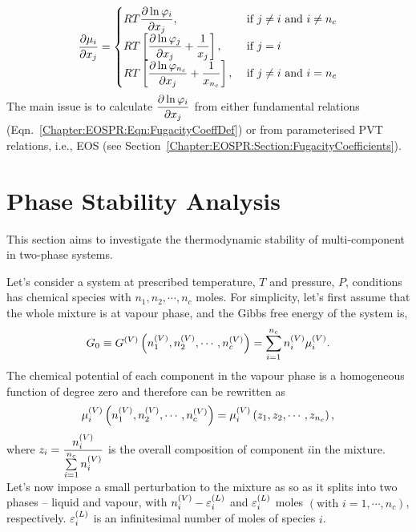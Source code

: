 \begin{equation}
  \frc{\partial\mu_{i}}{\partial x_{j}} = 
      \begin{cases}
          RT\frc{\partial\ln\varphi_{i}}{\partial x_{j}}, & \text{ if } j\ne i \text{ and } i\ne n_{c} \\
          RT\left[\frc{\partial\ln\varphi_{j}}{\partial x_{j}} + \frc{1}{x_{j}}\right], & \text{ if } j=i \\
          RT\left[\frc{\partial\ln\varphi_{n_{c}}}{\partial x_{j}} + \frc{1}{x_{n_{c}}}\right], & \text{ if } j\ne i \text{ and } i= n_{c}
      \end{cases}
\end{equation}
The main issue is to calculate $\frc{\partial\ln\varphi_{i}}{\partial x_{j}}$ from either fundamental relations (Eqn.~\ref{Chapter:EOSPR:Eqn:FugacityCoeffDef}) or from parameterised PVT relations, i.e., EOS (see Section~\ref{Chapter:EOSPR:Section:FugacityCoefficients}).

\section{Phase Stability Analysis}\label{Chapter:ThermodynamicFormulation:Section:PhaseStabilityAnalysis}
This section aims to investigate the thermodynamic stability of multi-component in two-phase systems. 

Let's consider a system at prescribed temperature, $T$ and pressure, $P$, conditions has chemical species with $n_{1}, n_{2}, \cdots, n_{c}$ moles. For simplicity, let's first assume that the whole mixture is at vapour phase, and the Gibbs free energy of the system is,
\begin{equation}
   G_{0} \equiv \mfr[G]{}{V}\left(\mfr[n]{1}{V}, \mfr[n]{2}{V}, \cdots, \mfr[n]{c}{V}\right) = \summation_{i=1}^{n_{c}}\mfr[n]{i}{V}\mfr[\mu]{i}{V}.
\end{equation}   
The chemical potential of each component in the vapour phase is a homogeneous function of degree zero and therefore can be rewritten as
\begin{displaymath}
   \mfr[\mu]{i}{V}\left(\mfr[n]{1}{V}, \mfr[n]{2}{V}, \cdots, \mfr[n]{c}{V}\right) = \mfr[\mu]{i}{V}\left(z_{1},z_{2}, \cdots, z_{n_{c}}\right),
\end{displaymath}
where $z_{i}=\frc{\mfr[n]{i}{V}}{\summation_{i=1}^{n_{c}}\mfr[n]{i}{V}}$ is the overall composition of component $i$in the mixture. Let's now impose a small perturbation to the mixture as so as it splits into two phases -- liquid and vapour, with $\mfr[n]{i}{V}-\mfr[\varepsilon]{i}{L}$ and $\mfr[\varepsilon]{i}{L}$ moles $\left(\text{with }i=1, \cdots, n_{c}\right)$, respectively. $\mfr[\varepsilon]{i}{L}$ is an infinitesimal number of moles of species $i$. 

